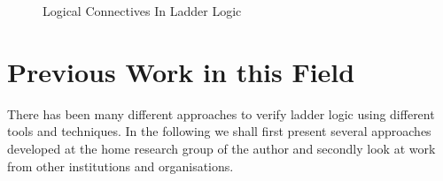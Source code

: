 \begin{figure}[h!]
 \begin{center}
\end{center}

\label{fig:ladderconnectives}
\caption{Logical Connectives In Ladder Logic}

\end{figure}

\medskip
\begin{comment}
In section 4 an approach is presented to capture the semantics of ladder logic
programs using propositional logic.
\end{comment}

\section{Previous Work in this Field}
There has been many different approaches to verify ladder logic using different tools and techniques. In the following we shall first present several approaches developed at the home research group of the author and secondly look at work from other institutions and organisations. 


